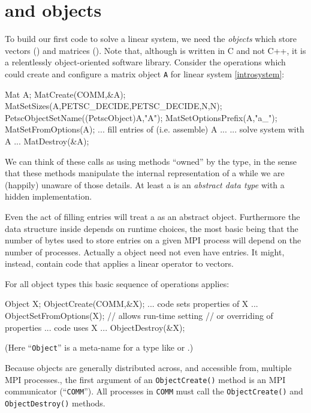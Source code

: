 \section{\PETSc \pVec and \pMat objects}

To build our first \PETSc code to solve a linear system, we need the \PETSc \emph{objects} which store vectors (\pVec) and matrices (\pMat).  Note that, although \PETSc is written in C and not C++, it is a relentlessly object-oriented software library.  Consider the operations which could create and configure a matrix object \texttt{A} for linear system \eqref{introsystem}:
\begin{code}
Mat A;
MatCreate(COMM,&A);
MatSetSizes(A,PETSC_DECIDE,PETSC_DECIDE,N,N);
PetscObjectSetName((PetscObject)A,"A");
MatSetOptionsPrefix(A,"a_");
MatSetFromOptions(A);
... fill entries of (i.e. assemble) A ...
... solve system with A ...
MatDestroy(&A);
\end{code}
We can think of these calls as using methods ``owned'' by the \pMat type, in the sense that these methods manipulate the internal representation of a \pMat while we are (happily) unaware of those details.  At least a \pMat is an \emph{abstract data type} with a hidden implementation.

Even the act of filling entries will treat a \pMat as an abstract object.  Furthermore the data structure inside depends on runtime choices, the most basic being that the number of bytes used to store entries on a given MPI process will depend on the number of processes.  Actually a \PETSc \pMat object need not even have entries.  It might, instead, contain code that applies a linear operator to vectors.

For all \PETSc object types this basic sequence of operations applies:
\begin{code}
Object X;
ObjectCreate(COMM,&X);
... code sets properties of X ...
ObjectSetFromOptions(X);  // allows run-time setting
                          // or overriding of properties
... code uses X ...
ObjectDestroy(&X);
\end{code}
(Here ``\texttt{Object}'' is a meta-name for a \PETSc type like \pVec or \pMat.)

Because \PETSc objects are generally distributed across, and accessible from, multiple MPI processes., the first argument of an \texttt{ObjectCreate()} method is an MPI communicator (``\texttt{COMM}'').  All processes in \texttt{COMM} must call the \texttt{ObjectCreate()} and  \texttt{ObjectDestroy()} methods.

